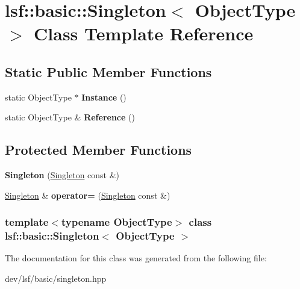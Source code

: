 \hypertarget{classlsf_1_1basic_1_1Singleton}{
\section{lsf::basic::Singleton$<$ ObjectType $>$ Class Template Reference}
\label{classlsf_1_1basic_1_1Singleton}
}
\subsection*{Static Public Member Functions}
\begin{DoxyCompactItemize}
\item 
\hypertarget{classlsf_1_1basic_1_1Singleton_a4016a690341c7c5f1c1d7cebe9714455}{
static ObjectType $\ast$ {\bfseries Instance} ()}
\label{classlsf_1_1basic_1_1Singleton_a4016a690341c7c5f1c1d7cebe9714455}

\item 
\hypertarget{classlsf_1_1basic_1_1Singleton_ac9410f83c5b5595c09be9933a59b8aba}{
static ObjectType \& {\bfseries Reference} ()}
\label{classlsf_1_1basic_1_1Singleton_ac9410f83c5b5595c09be9933a59b8aba}

\end{DoxyCompactItemize}
\subsection*{Protected Member Functions}
\begin{DoxyCompactItemize}
\item 
\hypertarget{classlsf_1_1basic_1_1Singleton_a94a1d39626178ed2ec783d76a854074f}{
{\bfseries Singleton} (\hyperlink{classlsf_1_1basic_1_1Singleton}{Singleton} const \&)}
\label{classlsf_1_1basic_1_1Singleton_a94a1d39626178ed2ec783d76a854074f}

\item 
\hypertarget{classlsf_1_1basic_1_1Singleton_a1c98e242d9514e0ed9d9269f0bdf0fd1}{
\hyperlink{classlsf_1_1basic_1_1Singleton}{Singleton} \& {\bfseries operator=} (\hyperlink{classlsf_1_1basic_1_1Singleton}{Singleton} const \&)}
\label{classlsf_1_1basic_1_1Singleton_a1c98e242d9514e0ed9d9269f0bdf0fd1}

\end{DoxyCompactItemize}
\subsubsection*{template$<$typename ObjectType$>$ class lsf::basic::Singleton$<$ ObjectType $>$}



The documentation for this class was generated from the following file:\begin{DoxyCompactItemize}
\item 
dev/lsf/basic/singleton.hpp\end{DoxyCompactItemize}
